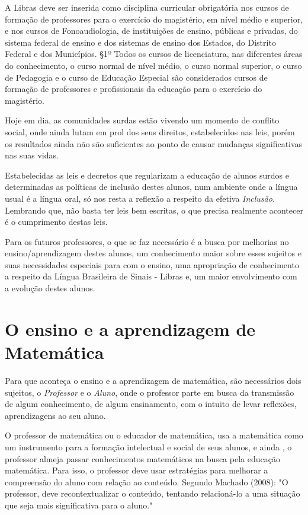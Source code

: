\documentclass[brasil]{abnt}
\begin{document}
			\begin{citacao} A Libras deve ser inserida como disciplina curricular obrigatória nos cursos de formação de professores para o exercício do magistério, em nível médio e superior, e nos cursos de 
							Fonoaudiologia, de instituições de ensino, públicas e privadas, do sistema federal de ensino e dos sistemas de ensino dos Estados, do Distrito Federal e dos Municípios.
							\S 1º Todos os cursos de licenciatura, nas diferentes áreas do conhecimento, o curso normal de nível médio, o curso normal superior, o curso de Pedagogia e o curso de Educação 
							Especial são considerados cursos de formação de professores e profissionais da educação para o exercício do magistério. 
			\end{citacao}
			
		Hoje em dia, as comunidades surdas estão vivendo um momento de conflito social, onde ainda lutam em prol dos seus direitos, estabelecidos nas leis, porém os resultados ainda não são suficientes ao 
		ponto de causar mudanças significativas nas suas vidas. 
		
		Estabelecidas as leis e decretos que regularizam a educação de alunos surdos e determinadas as políticas de inclusão destes alunos, num ambiente onde a língua usual é a língua oral, só nos resta a 
		reflexão a respeito da efetiva \textit{Inclusão}. Lembrando que, não basta ter leis bem escritas, o que precisa realmente acontecer é o cumprimento destas leis. 
		
		Para os futuros professores, o que se faz necessário é a busca por melhorias no ensino/aprendizagem destes alunos, um conhecimento maior sobre esses sujeitos e suas necessidades especiais para com o 
		ensino, uma apropriação de conhecimento a respeito da Língua Brasileira de Sinais - Libras e, um maior envolvimento com a evolução destes alunos.  			     
	
		
		
\chapter{O ensino e a aprendizagem de Matemática}
    Para que aconteça o ensino e a aprendizagem de matemática, são necessários dois sujeitos, o \textit{Professor} e o \textit{Aluno}, onde o professor parte em busca da transmissão de algum conhecimento, 
    de algum ensinamento, com o intuito de levar reflexões, aprendizagens ao seu aluno.
    
    O professor de matemática ou o educador de matemática, usa a matemática como um instrumento para a formação intelectual e social de seus alunos, e ainda , o professor almeja passar conhecimentos 
    matemáticos na busca pela educação matemática. Para isso, o professor deve usar estratégias para melhorar a compreensão do aluno com relação ao conteúdo. Segundo Machado (2008): "O professor, deve 
    recontextualizar o conteúdo, tentando relacioná-lo a uma situação que seja mais significativa para o aluno."
    
\end{document}
